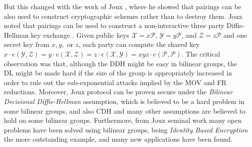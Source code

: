 But this changed with the work of Joux \cite{ANTS:Joux00}, where he showed that pairings can be also used to construct cryptographic schemes rather than to destroy them. Joux noted that pairings can be used to construct a non-interactive three party Diffie-Hellman key exchange \cite{ANTS:Joux00}. Given public keys $\mathcal{X}=x\mathcal{P}$, $\mathcal{Y}=y\mathcal{P}$, and $\mathcal{Z}=z\mathcal{P}$ and one secret key from $x,y,$ or $z$, each party can compute the shared key $x\cdot e(\mathcal{Y},\mathcal{Z})= y\cdot e(\mathcal{X},\mathcal{Z})= z\cdot e(\mathcal{X},\mathcal{Y})=xyz\cdot e(\mathcal{P},\mathcal{P})$. The critical observation was that, although the DDH might be easy in bilinear groups, the DL might be made hard if the size of the group is appropriately increased in order to rule out the sub-exponential attacks implied by the MOV and FR reductions. Moreover, Joux protocol can be proven secure under the \emph{Bilinear Decisional Diffie-Hellman} assumption, which is believed to be a hard problem in some bilinear groups, and also CDH and many other assumptions are believed to hold on some bilinear groups. Furthermore, from Joux seminal work many open problems have been solved using bilinear groups, being \emph{Identity Based Encryption} \cite{C:BonFra01} the more outstanding example, and many new applications have been found. 

%
%
